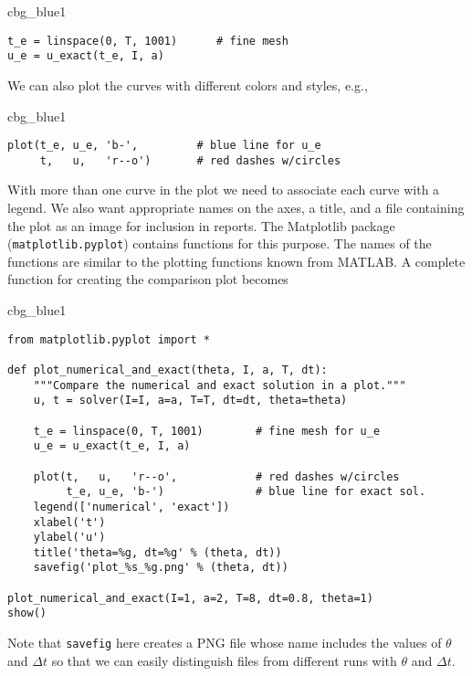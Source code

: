\documentclass[graybox,sectrefs,envcountresetchap,open=right,final]{svmonodo}
\newenvironment{_cod_tight}[1]{
   \def\FrameCommand{\colorbox{#1}}
   \FrameRule0.6pt\MakeFramed {\FrameRestore}\vskip3mm}
   {\vskip0mm\endMakeFramed}
\newenvironment{cod}[1]{
\bgroup\rmfamily
\fboxsep=0mm\relax
\begin{_cod_tight}{#1}
\list{}{\parsep=-2mm\parskip=0mm\topsep=0pt\leftmargin=2mm
\rightmargin=2\leftmargin\leftmargin=4pt\relax}
\item\relax}
{\endlist\end{_cod_tight}\egroup}
\begin{document}
\begin{cod}{cbg_blue1}\begin{Verbatim}[numbers=none,fontsize=\fontsize{9pt}{9pt},baselinestretch=0.95,xleftmargin=2mm]
t_e = linspace(0, T, 1001)      # fine mesh
u_e = u_exact(t_e, I, a)
\end{Verbatim}
\end{cod}
\noindent
We can also plot the curves with different colors and styles, e.g.,

\begin{cod}{cbg_blue1}\begin{Verbatim}[numbers=none,fontsize=\fontsize{9pt}{9pt},baselinestretch=0.95,xleftmargin=2mm]
plot(t_e, u_e, 'b-',         # blue line for u_e
     t,   u,   'r--o')       # red dashes w/circles
\end{Verbatim}
\end{cod}
\noindent

With more than one curve in the plot we need to associate each curve
with a legend. We also want appropriate names on the axes, a title,
and a file containing the plot as an image for inclusion in reports.
The Matplotlib package (\texttt{matplotlib.pyplot}) contains functions for
this purpose. The names of the functions are similar to the plotting
functions known from MATLAB.  A complete function for creating
the comparison plot becomes

\begin{cod}{cbg_blue1}\begin{Verbatim}[numbers=none,fontsize=\fontsize{9pt}{9pt},baselinestretch=0.95,xleftmargin=2mm]
from matplotlib.pyplot import *

def plot_numerical_and_exact(theta, I, a, T, dt):
    """Compare the numerical and exact solution in a plot."""
    u, t = solver(I=I, a=a, T=T, dt=dt, theta=theta)

    t_e = linspace(0, T, 1001)        # fine mesh for u_e
    u_e = u_exact(t_e, I, a)

    plot(t,   u,   'r--o',            # red dashes w/circles
         t_e, u_e, 'b-')              # blue line for exact sol.
    legend(['numerical', 'exact'])
    xlabel('t')
    ylabel('u')
    title('theta=%g, dt=%g' % (theta, dt))
    savefig('plot_%s_%g.png' % (theta, dt))

plot_numerical_and_exact(I=1, a=2, T=8, dt=0.8, theta=1)
show()
\end{Verbatim}
\end{cod}
\noindent
Note that \texttt{savefig} here creates a PNG file whose name includes the
values of $\theta$ and $\Delta t$ so that we can easily distinguish
files from different runs with $\theta$ and $\Delta t$.
\end{document}
